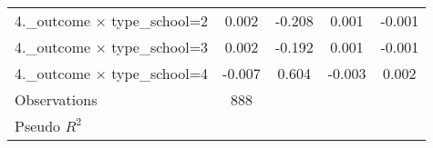 {\begin{tabular}{l*{4}{c}}
4.\_outcome $\times$ type\_school=2&    0.002\sym{**} &   -0.208\sym{**} &    0.001\sym{***}&   -0.001\sym{***}\\
4.\_outcome $\times$ type\_school=3&    0.002\sym{**} &   -0.192\sym{***}&    0.001\sym{***}&   -0.001\sym{***}\\
4.\_outcome $\times$ type\_school=4&   -0.007\sym{**} &    0.604\sym{***}&   -0.003\sym{***}&    0.002\sym{***}\\
\midrule
Observations    &      888         &                  &                  &                  \\
Pseudo \(R^{2}\)&                  &                  &                  &                  \\
\bottomrule
\end{tabular}
}
